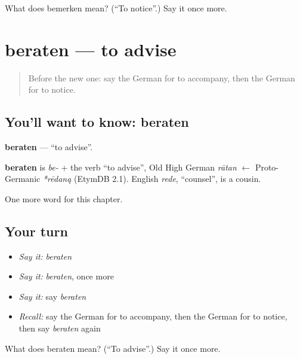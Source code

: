 \begin{tcolorbox}[breakable,colback=teal!4,colframe=teal!35!black,title={Before you move on}]
What does bemerken mean? (\textquotedblleft{}To notice\textquotedblright{}.) Say it once more.
\end{tcolorbox}
\section[beraten]{beraten — to advise}

\label{lesson:GE-C246-beraten}



\begin{quote}
Before the new one: say the German for to accompany, then the German for to notice.
\end{quote}

\subsection*{You'll want to know: beraten}
\textbf{beraten} — \textquotedblleft{}to advise\textquotedblright{}.

\begin{cousinweb}
\textbf{beraten} is \emph{be-} + the verb \textquotedblleft{}to advise\textquotedblright{}, Old High German \emph{rātan} $\leftarrow$ Proto-Germanic \emph{*rēdaną} (EtymDB 2.1). English \emph{rede}, \textquotedblleft{}counsel\textquotedblright{}, is a cousin.
\end{cousinweb}

\begin{grammarlens}[title={What you've built}]
One more word for this chapter.
\end{grammarlens}

\subsection*{Your turn}
\begin{itemize}
\raggedright
  \item \emph{Say it:} \emph{beraten}
  \item \emph{Say it:} \emph{beraten}, once more
  \item \emph{Say it:} say \emph{beraten}
  \item \emph{Recall:} say the German for to accompany, then the German for to notice, then say \emph{beraten} again
\end{itemize}

\begin{tcolorbox}[breakable,colback=teal!4,colframe=teal!35!black,title={Before you move on}]
What does beraten mean? (\textquotedblleft{}To advise\textquotedblright{}.) Say it once more.
\end{tcolorbox}
